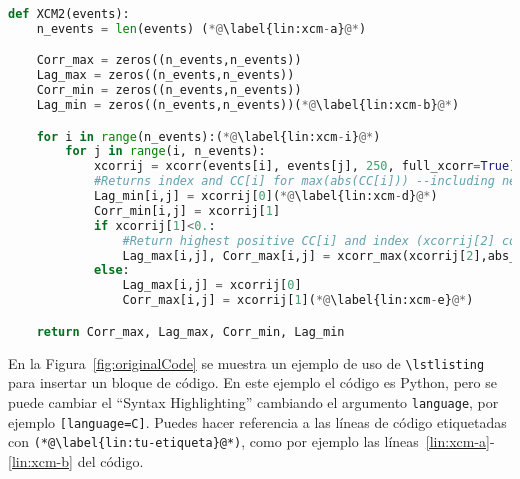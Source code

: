 \begin{figure*}[!t]
    \centering
    \begin{minipage}{0.9\linewidth}
    {\footnotesize
    \begin{lstlisting}[language=Python]
def XCM2(events):
    n_events = len(events) (*@\label{lin:xcm-a}@*)

    Corr_max = zeros((n_events,n_events))
    Lag_max = zeros((n_events,n_events))
    Corr_min = zeros((n_events,n_events))
    Lag_min = zeros((n_events,n_events))(*@\label{lin:xcm-b}@*)

    for i in range(n_events):(*@\label{lin:xcm-i}@*)
        for j in range(i, n_events):
            xcorrij = xcorr(events[i], events[j], 250, full_xcorr=True) (*@\label{lin:xcm-c}@*)
            #Returns index and CC[i] for max(abs(CC[i])) --including negative values--
            Lag_min[i,j] = xcorrij[0](*@\label{lin:xcm-d}@*)
            Corr_min[i,j] = xcorrij[1]
            if xcorrij[1]<0.:
                #Return highest positive CC[i] and index (xcorrij[2] contains CC)
                Lag_max[i,j], Corr_max[i,j] = xcorr_max(xcorrij[2],abs_max=False)
            else:
                Lag_max[i,j] = xcorrij[0]
                Corr_max[i,j] = xcorrij[1](*@\label{lin:xcm-e}@*)

    return Corr_max, Lag_max, Corr_min, Lag_min
    \end{lstlisting}
    }
    \end{minipage}
    \caption{Código de ejemplo en python.}
    \label{fig:originalCode}
    \end{figure*}

En la Figura~\ref{fig:originalCode} se muestra un ejemplo de uso de \verb+\lstlisting+ para insertar un bloque de código. En este ejemplo el código es Python, pero se puede cambiar el ``Syntax Highlighting'' cambiando el argumento \verb+language+, por ejemplo \verb+[language=C]+. Puedes hacer referencia a las líneas de código etiquetadas con \verb+(*@\label{lin:tu-etiqueta}@*)+, como por ejemplo las líneas~\ref{lin:xcm-a}-\ref{lin:xcm-b} del código.



